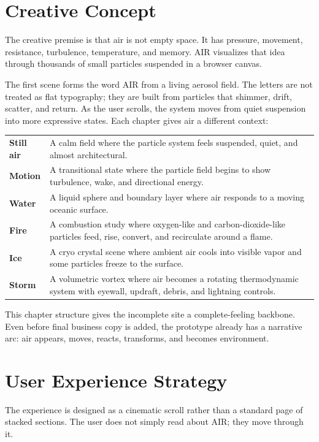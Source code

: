 \documentclass[11pt,a4paper]{article}
\newcommand{\sectionrule}{\vspace{0.2em}{\color{AirLine}\hrule height 0.8pt}\vspace{0.8em}}
\begin{document}
\section*{Creative Concept}
\sectionrule

The creative premise is that air is not empty space. It has pressure, movement, resistance, turbulence, temperature, and memory. AIR visualizes that idea through thousands of small particles suspended in a browser canvas.

The first scene forms the word AIR from a living aerosol field. The letters are not treated as flat typography; they are built from particles that shimmer, drift, scatter, and return. As the user scrolls, the system moves from quiet suspension into more expressive states. Each chapter gives air a different context:

\begin{longtable}{>{\bfseries}p{} p{}}
Still air & A calm field where the particle system feels suspended, quiet, and almost architectural. \\
Motion & A transitional state where the particle field begins to show turbulence, wake, and directional energy. \\
Water & A liquid sphere and boundary layer where air responds to a moving oceanic surface. \\
Fire & A combustion study where oxygen-like and carbon-dioxide-like particles feed, rise, convert, and recirculate around a flame. \\
Ice & A cryo crystal scene where ambient air cools into visible vapor and some particles freeze to the surface. \\
Storm & A volumetric vortex where air becomes a rotating thermodynamic system with eyewall, updraft, debris, and lightning controls. \\
\end{longtable}

This chapter structure gives the incomplete site a complete-feeling backbone. Even before final business copy is added, the prototype already has a narrative arc: air appears, moves, reacts, transforms, and becomes environment.

\section*{User Experience Strategy}
\sectionrule

The experience is designed as a cinematic scroll rather than a standard page of stacked sections. The user does not simply read about AIR; they move through it.
\end{document}
